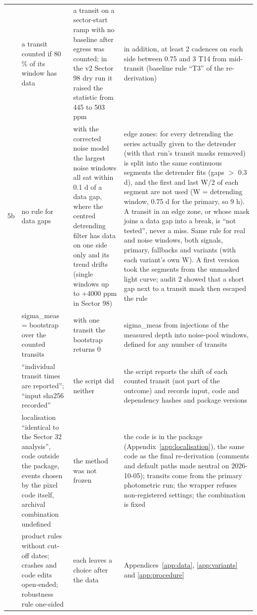 \begin{longtable}{>{\raggedright\arraybackslash}p{}>{\raggedright\arraybackslash}p{}>{\raggedright\arraybackslash}p{}>{\raggedright\arraybackslash}p{}}
5 & a transit counted if 80 \% of its window has data & a transit on a sector-start ramp with no baseline after egress was counted; in the v2 Sector 98 dry run it raised the statistic from 445 to 503 ppm & in addition, at least 2 cadences on each side between 0.75 and 3 T14 from mid-transit (baseline rule ``T3'' of the re-derivation) \\
5b & no rule for data gaps & with the corrected noise model the largest noise windows all sat within 0.1 d of a data gap, where the centred detrending filter has data on one side only and its trend drifts (single windows up to +4000 ppm in Sector 98) & edge zones: for every detrending the series actually given to the detrender (with that run's transit masks removed) is split into the same continuous segments the detrender fits (gaps $>$ 0.3 d), and the first and last W/2 of each segment are not used (W = detrending window, 0.75 d for the primary, so 9 h). A transit in an edge zone, or whose mask joins a data gap into a break, is ``not tested'', never a miss. Same rule for real and noise windows, both signals, primary, fallbacks and variants (with each variant's own W). A first version took the segments from the unmasked light curve; audit 2 showed that a short gap next to a transit mask then escaped the rule \\
6 & sigma\_meas = bootstrap over the counted transits & with one transit the bootstrap returns 0 & sigma\_meas from injections of the measured depth into noise-pool windows, defined for any number of transits \\
7 & ``individual transit times are reported''; ``input sha256 recorded'' & the script did neither & the script reports the shift of each counted transit (not part of the outcome) and records input, code and dependency hashes and package versions \\
8 & localisation ``identical to the Sector 32 analysis'', code outside the package, events chosen by the pixel code itself, archival combination undefined & the method was not frozen & the code is in the package (Appendix~\ref{app:localisation}), the same code as the final re-derivation (comments and default paths made neutral on 2026-10-05); transits come from the primary photometric run; the wrapper refuses non-registered settings; the combination is fixed \\
9 & product rules without cut-off dates; crashes and code edits open-ended; robustness rule one-sided & each leaves a choice after the data & Appendices~\ref{app:data}, \ref{app:variants} and \ref{app:procedure} \\

\end{longtable}
